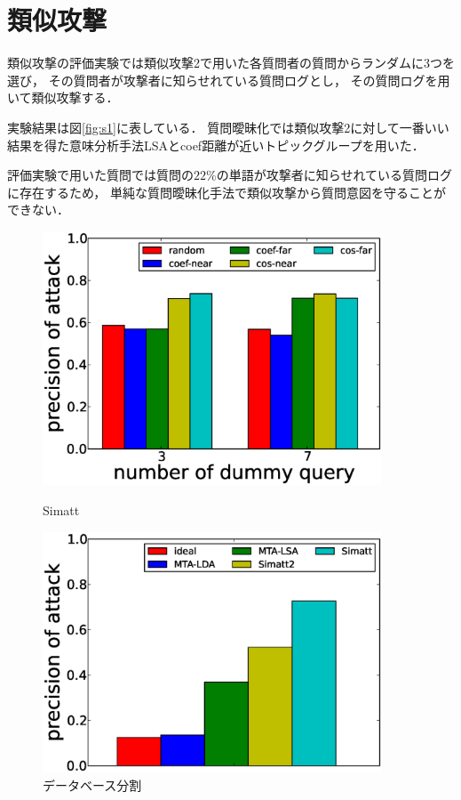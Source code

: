\documentclass[master]{suribt}
\theoremstyle{definition}
\begin{document}
 \section{類似攻撃}
 類似攻撃の評価実験では類似攻撃2で用いた各質問者の質問からランダムに3つを選び，
 その質問者が攻撃者に知らせれている質問ログとし，
 その質問ログを用いて類似攻撃する．
 
 実験結果は図\ref{fig:s1}に表している．
 質問曖昧化では類似攻撃2に対して一番いい結果を得た意味分析手法LSAとcoef距離が近いトピックグループを用いた．

 評価実験で用いた質問では質問の$22\%$の単語が攻撃者に知らせれている質問ログに存在するため，
 単純な質問曖昧化手法で類似攻撃から質問意図を守ることができない．

 \begin{figure}
 \begin{minipage}[t]{0.5\linewidth}
 \centering
 \includegraphics[width=0.9\textwidth]{SA2.eps}
 \vspace{5em}
 \caption{Simatt}
 \label{fig:s1}
 \end{minipage}%
 \begin{minipage}[t]{0.5\linewidth}
 \centering
 \includegraphics[width=0.9\textwidth]{DS.eps}
 \vspace{5em}
 \caption{データベース分割}
 \label{fig:ds}
 \end{minipage}
 \end{figure}
\end{document}
